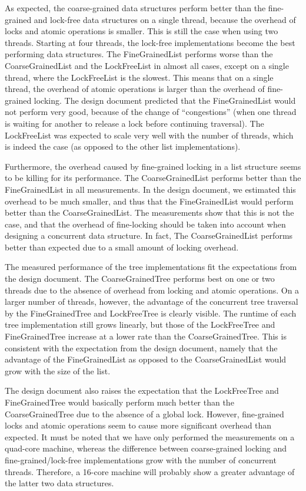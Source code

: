 \documentclass[a4paper]{article}
\begin{document}
As expected, the coarse-grained data structures perform better than the
fine-grained and lock-free data structures on a single thread, because the
overhead of locks and atomic operations is smaller. This is still the case when
using two threads. Starting at four threads, the lock-free implementations
become the best performing data structures. The FineGrainedList performs worse
than the CoarseGrainedList and the LockFreeList in almost all cases, except on
a single thread, where the LockFreeList is the slowest. This means that on a
single thread, the overhead of atomic operations is larger than the overhead of
fine-grained locking. The design document predicted that the FineGrainedList
would not perform very good, because of the change of ``congestions'' (when one
thread is waiting for another to release a lock before continuing traversal).
The LockFreeList was expected to scale very well with the number of threads,
which is indeed the case (as opposed to the other list implementations).

Furthermore, the overhead caused by fine-grained locking in a list structure
seems to be killing for its performance. The CoarseGrainedList performs better
than the FineGrainedList in all measurements.  In the design document, we
estimated this overhead to be much smaller, and thus that the FineGrainedList
would perform better than the CoarseGrainedList. The measurements show that
this is not the case, and that the overhead of fine-locking should be taken
into account when designing a concurrent data structure. In fact, The
CoarseGrainedList performs better than expected due to a small amount of
locking overhead.

The measured performance of the tree implementations fit the expectations from
the design document. The CoarseGrainedTree performs best on one or two threads
due to the absence of overhead from locking and atomic operations. On a larger
number of threads, however, the advantage of the concurrent tree traversal by
the FineGrainedTree and LockFreeTree is clearly visible. The runtime of each
tree implementation still grows linearly, but those of the LockFreeTree and
FineGrainedTree increase at a lower rate than the CoarseGrainedTree. This is
consistent with the expectation from the design document, namely that the
advantage of the FineGrainedList as opposed to the CoarseGrainedList would grow
with the size of the list.

The design document also raises the expectation that the LockFreeTree and
FineGrainedTree would basically perform much better than the CoarseGrainedTree
due to the absence of a global lock. However, fine-grained locks and atomic
operations seem to cause more significant overhead than expected. It must be
noted that we have only performed the measurements on a quad-core machine,
whereas the difference between coarse-grained locking and
fine-grained/lock-free implementations grow with the number of concurrent
threads. Therefore, a 16-core machine will probably show a greater advantage of
the latter two data structures.
\end{document}
